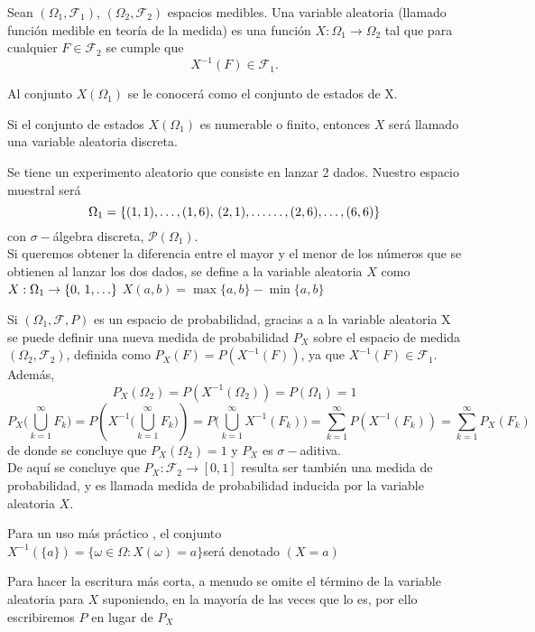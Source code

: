 \begin{Def}
    Sean $(\Omega_1,\mathscr{F}_1)$, $(\Omega_2,\mathscr{F}_2)$ espacios medibles. Una variable aleatoria (llamado función medible en teoría de la medida) es una función $X:\Omega_1\rightarrow \Omega_2$ tal que para cualquier $F\in\mathscr{F}_2$ se cumple que $$X^{-1}(F)\in\mathscr{F}_1.$$
\end{Def}
 Al conjunto $X(\Omega_1)$ se le conocerá como el conjunto de estados de X.
\begin{Obs}
    Si el conjunto de estados $X(\Omega_1)$ es numerable o finito, entonces $X$ será llamado una variable aleatoria discreta.
\end{Obs}
\begin{Ejm}
    Se tiene un experimento aleatorio que consiste en lanzar 2 dados. Nuestro espacio muestral será $$\Omega_1=\{(1,1),\ldots,(1,6),\thinspace(2,1),\ldots\ldots,(2,6),\ldots,(6,6)\}$$ con $\sigma-$álgebra discreta, $\mathscr{P}(\Omega_1)$.\\ 
   Si queremos obtener la diferencia entre el mayor y el menor de los números que se obtienen al lanzar los dos dados, se define a la variable aleatoria $X$ como $X:\Omega_1\rightarrow \{0,\thinspace 1,\ldots\}$ $X(a,b)=\max \{a,b\}-\min\{a,b\}$
\end{Ejm}
Si $(\Omega_1,\mathscr{F},P)$ es un espacio de probabilidad, gracias a a la variable aleatoria X se puede definir una nueva medida de probabilidad $P_X$ sobre el espacio de medida $(\Omega_2,\mathscr{F}_2)$, definida como $P_X(F)=P(X^{-1}(F))$, ya que $X^{-1}(F)\in\mathscr{F}_1$. Además, $$P_X(\Omega_2)=P(X^{-1}(\Omega_2))=P(\Omega_1)=1$$ $$P_X\big(\bigcup_{k=1}^\infty F_k\big)=P(X^{-1}\big(\bigcup_{k=1}^\infty
F_k\big))=P \big(\bigcup_{k=1}^\infty X^{-1}(F_k) \big)=\sum_{k=1}^\infty P(X^{-1}(F_k))=\sum_{k=1}^\infty P_X(F_k)$$
de donde se concluye que $P_X(\Omega_2)= 1$ y $P_X$ es $\sigma-$aditiva.\\
De aquí se concluye que $P_X:\mathscr{F_2}\rightarrow [0,1]$ resulta ser también una medida de probabilidad, y es llamada medida de probabilidad inducida por la variable aleatoria $X$.\\
\begin{Obs}
    Para un uso más práctico , el conjunto\\ $X^{-1}(\{a\})=\{\omega\in\Omega: X(\omega)=a\}$será denotado $(X= a)$\\
\end{Obs}
Para hacer la escritura más corta, a menudo se omite el término de la variable aleatoria para $X$ suponiendo, en la mayoría de las veces que lo es, por ello escribiremos $P$ en lugar de $P_X$\\\\
